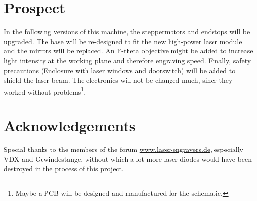 \documentclass[a4paper, 11pt]{scrartcl}
\begin{document}
\section{Prospect}
In the following versions of this machine, the steppermotors and endstops will be upgraded. The base will be re-designed to fit the new high-power laser module and the mirrors will be replaced. An F-theta objective might be added to increase light intensity at the working plane and therefore engraving speed. Finally, safety precautions (Enclosure with laser windows and doorswitch) will be added to shield the laser beam. The electronics will not be changed much, since they worked without problems\footnote{Maybe a PCB will be designed and manufactured for the schematic.}. 
\section{Acknowledgements}
Special thanks to the members of the forum \url{www.laser-engravers.de}, especially \glqq VDX \grqq and \glqq Gewindestange\grqq, without which a lot more laser diodes would have been destroyed in the process of this project.


\end{document}

